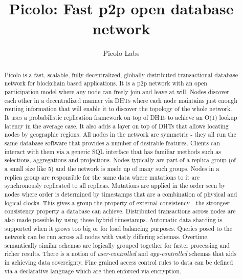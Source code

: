 \documentclass[preprint,10pt]{elsarticle}
\theoremstyle{definition}
\begin{document}
\begin{frontmatter}


\title{Picolo: Fast p2p open database network}

\author{Picolo Labs}
\address{San Francisco, California}


\begin{abstract}
Picolo is a fast, scalable, fully decentralized, globally distributed transactional database network for blockchain based applications. It is a p2p network with an open participation model where any node can freely join and leave at will. Nodes discover each other in a decentralized manner via DHTs where each node maintains just enough routing information that will enable it to discover the topology of the whole network. It uses a probabilistic replication framework on top of DHTs to achieve an O(1) lookup latency in the average case. It also adds a layer on top of DHTs that allows locating nodes by geographic regions.
\newline
\newline
All nodes in the network are symmetric - they all run the same database software that provides a number of desirable features. Clients can interact with them via a generic SQL interface that has familiar methods such as selections, aggregations and projections. Nodes typically are part of a replica group (of a small size like 5) and the network is made up of many such groups. Nodes in a replica group are responsible for the same data where mutations to it are synchronously replicated to all replicas. Mutations are applied in the order seen by nodes where order is determined by timestamps that are a combination of physical and logical clocks. This gives a group the property of external consistency - the strongest consistency property a database can achieve. Distributed transactions across nodes are also made possible by using these hybrid timestamps. Automatic data sharding is supported when it grows too big or for load balancing purposes. Queries posed to the network can be run across all nodes with vastly differing schemas. Overtime, semantically similar schemas are logically grouped together for faster processing and richer results. There is a notion of \textit{user-controlled} and \textit{app-controlled} schemas that aids in achieving data sovereignty. Fine grained access control rules to data can be defined via a declarative language which are then enforced via encryption.

\end{abstract}
\end{frontmatter}
\end{document}
